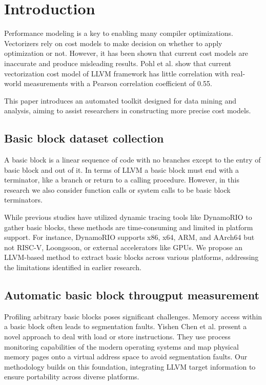 \section{Introduction}
Performance modeling is a key to enabling many compiler optimizations. Vectorizers rely on cost models to make decision on whether to apply optimization or not. However, it has been shown that current cost models are inaccurate and produce misleading results. Pohl et al. \cite{pohlPortableCostModeling2019} show that current vectorization cost model of LLVM framework has little correlation with real-world measurements with a Pearson correlation coefficient of 0.55.

This paper introduces an automated toolkit designed for data mining and analysis, aiming to assist researchers in constructing more precise cost models.

\subsection{Basic block dataset collection}

A basic block is a linear sequence of code with no branches except to the entry of basic block and out of it. In terms of LLVM a basic block must end with a terminator, like a branch or return to a calling procedure. However, in this research we also consider function calls or system calls to be basic block terminators.

While previous studies have utilized dynamic tracing tools like DynamoRIO \cite{chenBHiveBenchmarkSuite2019} to gather basic blocks, these methods are time-consuming and limited in platform support. For instance, DynamoRIO supports x86, x64, ARM, and AArch64 \cite{brueningInfrastructureAdaptiveDynamic2003} but not RISC-V, Loongsoon, or external accelerators like GPUs. We propose an LLVM-based method to extract basic blocks across various platforms, addressing the limitations identified in earlier research.

\subsection{Automatic basic block througput measurement}

Profiling arbitrary basic blocks poses significant challenges. Memory access within a basic block often leads to segmentation faults. Yishen Chen et al. \cite{chenBHiveBenchmarkSuite2019} present a novel approach to deal with load or store instructions. They use process monitoring capabilities of the modern operating systems and map physical memory pages onto a virtual address space to avoid segmentation faults. Our methodology builds on this foundation, integrating LLVM target information to ensure portability across diverse platforms.

